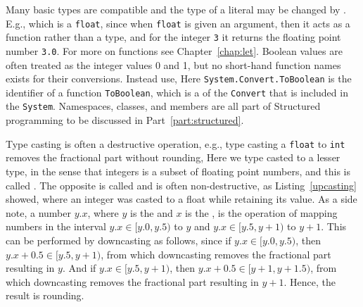 Many basic types are compatible and the type of a literal may be changed by . E.g.,
%
which is a \lstinline!float!, since when \lstinline|float| is given an argument, then it acts as a function rather than a type, and for the integer \lstinline|3| it returns the floating point number \lstinline|3.0|.  For more on functions see Chapter~\ref{chap:let}. Boolean values are often treated as the integer values 0 and 1, but no short-hand function names exists for their conversions. Instead use,
%
Here \lstinline|System.Convert.ToBoolean| is the identifier of a function \lstinline|ToBoolean|, which is a  of the  \lstinline|Convert| that is included in the  \lstinline|System|. Namespaces, classes, and members are all part of Structured programming to be discussed in Part~\ref{part:structured}.

Type casting is often a destructive operation, e.g., type casting a \lstinline{float} to \lstinline{int} removes the fractional part without rounding,
%
Here we type casted to a lesser type, in the sense that integers is a subset of floating point numbers, and this is called . The opposite is called  and is often non-destructive, as Listing~\ref{upcasting} showed, where an integer was casted to a float while retaining its value. As a side note,  a number $y.x$, where $y$ is the  and $x$ is the , is the operation of mapping numbers in the interval $y.x \in [y.0,y.5)$ to $y$ and $y.x\in [y.5,y+1)$ to $y+1$. This can be performed by downcasting as follows,
%
%
since if $y.x\in [y.0, y.5)$, then $y.x+0.5\in [y.5, y+1)$, from which downcasting removes the fractional part resulting in $y$. And if $y.x\in [y.5, y+1)$, then $y.x+0.5\in [y+1,y+1.5)$, from which downcasting removes the fractional part resulting in $y+1$. Hence, the result is rounding. 

